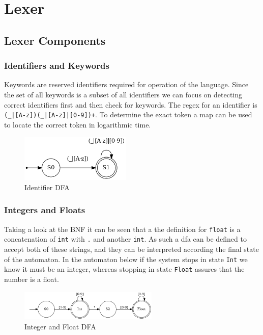 \documentclass[11pt]{article}
\begin{document}
\newpage
\section{Lexer}
\label{sec:orgb899628}

\subsection{Lexer Components}
\label{sec:orgd672535}

\subsubsection{Identifiers and Keywords}
\label{sec:orgf6936df}

Keywords are reserved identifiers required for operation of the language. Since the set of all keywords is a subset of all identifiers we can focus on detecting correct identifiers first and then check for keywords. The regex for an identifier is \texttt{(\_|[A-z])(\_|[A-z]|[0-9])+}. To determine the exact token a map can be used to locate the correct token in logarithmic time.

\begin{figure}[htbp]
\centering
\includegraphics[width=200px]{automaton/identifier.png}
\caption{\label{fig:iden-dfa}Identifier DFA}
\end{figure}


\subsubsection{Integers and Floats}
\label{sec:org2e2f07d}

Taking a look at the BNF it can be seen that a the definition for \texttt{float} is a concatenation of \texttt{int} with \texttt{.} and another \texttt{int}. As such a dfa can be defined to accept both of these strings, and they can be interpreted according the final state of the automaton. In the automaton below if the system stops in state \texttt{Int} we know it must be an integer, whereas stopping in state \texttt{Float} assures that the number is a float.

\begin{figure}[htbp]
\centering
\includegraphics[width=250px]{automaton/nums.png}
\caption{\label{fig:nums-dfa}Integer and Float DFA}
\end{figure}
\end{document}
